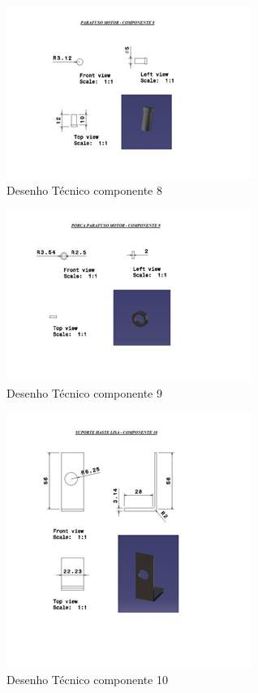 \begin{apendicesenv}
\begin{figure}[H]
    \centering
      \includegraphics[scale=1.0]{figuras/tec8.png}
    \caption{Desenho Técnico componente 8}
    \label{tec8}
\end{figure}

\begin{figure}[H]
    \centering
      \includegraphics[scale=1.0]{figuras/tec9.png}
    \caption{Desenho Técnico componente 9}
    \label{tec9}
\end{figure}

\begin{figure}[H]
    \centering
      \includegraphics[scale=1.0]{figuras/tec10.png}
    \caption{Desenho Técnico componente 10}
    \label{tec10}
\end{figure}


\end{apendicesenv}
